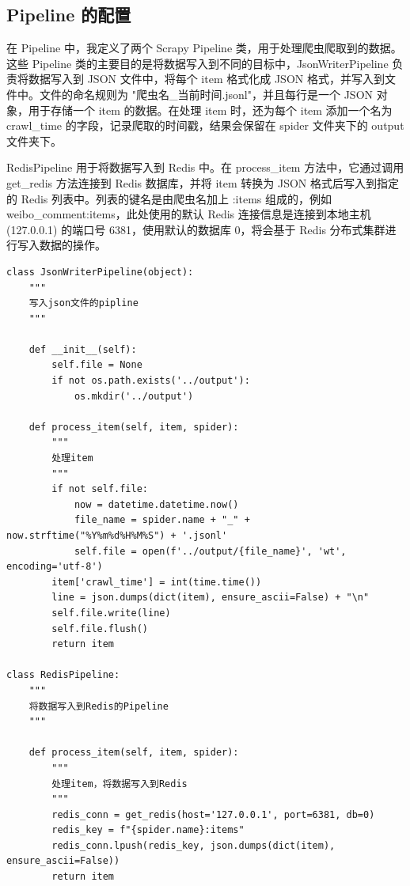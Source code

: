 \documentclass[12pt,hyperref,a4paper,UTF8]{ctexart}
\begin{document}
\subsection{Pipeline 的配置}

在 Pipeline 中，我定义了两个 Scrapy Pipeline 类，用于处理爬虫爬取到的数据。这些 Pipeline 类的主要目的是将数据写入到不同的目标中，JsonWriterPipeline 负责将数据写入到 JSON 文件中，将每个 item 格式化成 JSON 格式，并写入到文件中。文件的命名规则为 "爬虫名\_当前时间.jsonl"，并且每行是一个 JSON 对象，用于存储一个 item 的数据。在处理 item 时，还为每个 item 添加一个名为 crawl\_time 的字段，记录爬取的时间戳，结果会保留在 spider 文件夹下的 output 文件夹下。

RedisPipeline 用于将数据写入到 Redis 中。在 process\_item 方法中，它通过调用 get\_redis 方法连接到 Redis 数据库，并将 item 转换为 JSON 格式后写入到指定的 Redis 列表中。列表的键名是由爬虫名加上 :items 组成的，例如 weibo\_comment:items，此处使用的默认 Redis 连接信息是连接到本地主机 (127.0.0.1) 的端口号 6381，使用默认的数据库 0，将会基于 Redis 分布式集群进行写入数据的操作。

\begin{verbatim} 
class JsonWriterPipeline(object):
    """
    写入json文件的pipline
    """

    def __init__(self):
        self.file = None
        if not os.path.exists('../output'):
            os.mkdir('../output')

    def process_item(self, item, spider):
        """
        处理item
        """
        if not self.file:
            now = datetime.datetime.now()
            file_name = spider.name + "_" + now.strftime("%Y%m%d%H%M%S") + '.jsonl'
            self.file = open(f'../output/{file_name}', 'wt', encoding='utf-8')
        item['crawl_time'] = int(time.time())
        line = json.dumps(dict(item), ensure_ascii=False) + "\n"
        self.file.write(line)
        self.file.flush()
        return item

class RedisPipeline:
    """
    将数据写入到Redis的Pipeline
    """

    def process_item(self, item, spider):
        """
        处理item，将数据写入到Redis
        """
        redis_conn = get_redis(host='127.0.0.1', port=6381, db=0)
        redis_key = f"{spider.name}:items"
        redis_conn.lpush(redis_key, json.dumps(dict(item), ensure_ascii=False))
        return item
\end{verbatim}        
\end{document}
